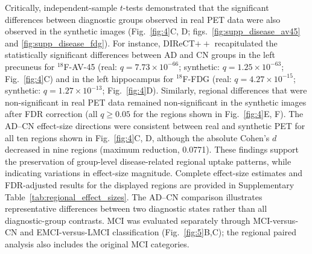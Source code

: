 Critically, independent-sample $t$-tests demonstrated that the significant differences between diagnostic groups observed in real PET data were also observed in the synthetic images (Fig.~\ref{fig:4}C, D; figs.~\ref{fig:supp_disease_av45} and \ref{fig:supp_disease_fdg}). For instance, DIReCT$++$ recapitulated the statistically significant differences between AD and CN groups in the left precuneus for $^{18}$F-AV-45 (real: $q=7.73\times10^{-66}$; synthetic: $q=1.25\times10^{-63}$; Fig.~\ref{fig:4}C) and in the left hippocampus for $^{18}$F-FDG (real: $q=4.27\times10^{-15}$; synthetic: $q=1.27\times10^{-13}$; Fig.~\ref{fig:4}D). Similarly, regional differences that were non-significant in real PET data remained non-significant in the synthetic images after FDR correction (all $q\geq0.05$ for the regions shown in Fig.~\ref{fig:4}E, F). The AD--CN effect-size directions were consistent between real and synthetic PET for all ten regions shown in Fig.~\ref{fig:4}C, D, although the absolute Cohen's $d$ decreased in nine regions (maximum reduction, 0.0771). These findings support the preservation of group-level disease-related regional uptake patterns, while indicating variations in effect-size magnitude. Complete effect-size estimates and FDR-adjusted results for the displayed regions are provided in Supplementary Table~\ref{tab:regional_effect_sizes}. The AD--CN comparison illustrates representative differences between two diagnostic states rather than all diagnostic-group contrasts. MCI was evaluated separately through MCI-versus-CN and EMCI-versus-LMCI classification (Fig.~\ref{fig:5}B,C); the regional paired analysis also includes the original MCI categories.
